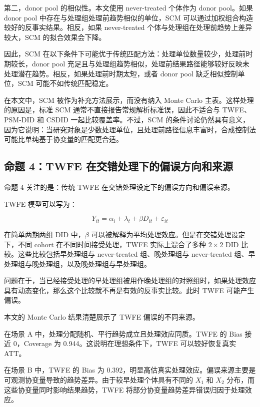 \documentclass[
  fontset=windows]{ctexart}
\begin{document}
第二，donor pool 的相似性。本文使用 never-treated 个体作为 donor
pool。如果 donor pool 中存在与处理组处理前趋势相似的单位，SCM
可以通过加权组合构造较好的反事实结果。相反，如果 never-treated
个体与处理组在处理前趋势上差异较大，SCM 的拟合效果会下降。

因此，SCM
在以下条件下可能优于传统匹配方法：处理单位数量较少，处理前时期较长，donor
pool
充足且与处理组趋势相似，处理前结果路径能够较好反映未处理潜在趋势。相反，如果处理前时期太短，或者
donor pool 缺乏相似控制单位，SCM 可能不如传统匹配稳定。

在本文中，SCM 被作为补充方法展示，而没有纳入 Monte Carlo
主表。这样处理的原因是，标准 SCM
通常不直接报告常规解析标准误，因此不适合与 TWFE、PSM-DID 和 CSDID
一起比较覆盖率。不过，SCM
的条件讨论仍然具有意义，因为它说明：当研究对象是少数处理单位，且处理前路径信息丰富时，合成控制法可能比单纯基于协变量的匹配更合适。

\subsection{命题 4：TWFE
在交错处理下的偏误方向和来源}\label{ux547dux9898-4twfe-ux5728ux4ea4ux9519ux5904ux7406ux4e0bux7684ux504fux8befux65b9ux5411ux548cux6765ux6e90}

命题 4 关注的是：传统 TWFE 在交错处理设定下的偏误方向和偏误来源。

TWFE 模型可以写为：

\[
Y_{it}=\alpha_i+\lambda_t+\beta D_{it}+\varepsilon_{it}
\]

在简单两期两组 DID 中，\(\beta\)
可以被解释为平均处理效应。但是在交错处理设定下，不同 cohort
在不同时间接受处理，TWFE 实际上混合了多种 \(2\times 2\) DID
比较。这些比较包括早处理组与 never-treated 组、晚处理组与 never-treated
组、早处理组与晚处理组，以及晚处理组与早处理组。

问题在于，当已经接受处理的早处理组被用作晚处理组的对照组时，如果处理效应具有动态变化，那么这个比较就不再是有效的反事实比较。此时
TWFE 可能产生偏误。

本文的 Monte Carlo 结果清楚展示了 TWFE 偏误的不同来源。

在场景 A 中，处理分配随机、平行趋势成立且处理效应同质。TWFE 的 Bias 接近
0，Coverage 为 0.944。这说明在理想条件下，TWFE 可以较好恢复真实 ATT。

在场景 B 中，TWFE 的 Bias 为
0.392，明显高估真实处理效应。偏误来源主要是可观测协变量导致的趋势差异。由于较早处理个体具有不同的
\(X_1\) 和 \(X_2\) 分布，而这些协变量同时影响结果趋势，TWFE
将部分协变量趋势差异错误归因于处理效应。
\end{document}
